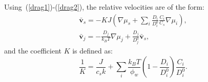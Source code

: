 \documentclass[runningheads]{llncs}
\begin{document}
Using~(\ref{drag1})-(\ref{drag2}), the relative velocities are of the form:
\begin{eqnarray}
\bar{\mathbf{v}}_s = -K J \left(\nabla \mu_s +\sum_i \frac{D_i}{D^0_i} \frac{C_i}{C_s} \nabla \mu_i\right),\\
\bar{\mathbf{v}}_j = - \frac{D_j}{k_B T}\nabla \mu_j + \frac{D_j}{D^0_j} \bar{\mathbf{v}}_s, \label{vbar}
\end{eqnarray}
and the coefficient $K$ is defined as:
\begin{equation}
\frac{1}{K} = \frac{J}{c_sk} + \sum_i \frac{k_B T}{\phi_w} \left(1-\frac{D_i}{D^0_i}\right) \frac{C_i}{D^0_i}.
\end{equation}



%
\newpage


%
\end{document}
